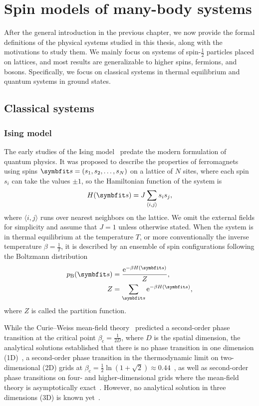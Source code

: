 \chapter{Spin models of many-body systems}
\label{ch:systems}

After the general introduction in the previous chapter, we now provide the formal definitions of the physical systems studied in this thesis, along with the motivations to study them. We mainly focus on systems of spin-$\frac{1}{2}$ particles placed on lattices, and most results are generalizable to higher spins, fermions, and bosons. Specifically, we focus on classical systems in thermal equilibrium and quantum systems in ground states.

\section{Classical systems}
\label{sec:cl-sys}

\subsection{Ising model}
\label{sec:cl-ising}

The early studies of the Ising model~\cite{ising1925contribution, niss2008history} predate the modern formulation of quantum physics. It was proposed to describe the properties of ferromagnets using spins $\vs = (s_1, s_2, \ldots, s_N)$ on a lattice of $N$ sites, where each spin $s_i$ can take the values $\pm 1$, so the Hamiltonian function of the system is
\begin{equation}
H(\vs) = J \sum_{\langle i, j \rangle} s_i s_j,
\label{eq:cl-ising}
\end{equation}
where $\langle i, j \rangle$ runs over nearest neighbors on the lattice. We omit the external fields for simplicity and assume that $J = 1$ unless otherwise stated. When the system is in thermal equilibrium at the temperature $T$, or more conventionally the inverse temperature $\beta = \frac{1}{T}$, it is described by an ensemble of spin configurations following the Boltzmann distribution
\begin{align}
p_\text{B}(\vs) &= \frac{\rme^{-\beta H(\vs)}}{Z}, \label{eq:boltzmann} \\
Z &= \sum_\vs \rme^{-\beta H(\vs)},
\end{align}
where $Z$ is called the partition function.

While the Curie--Weiss mean-field theory~\cite{weiss1907hypothese} predicted a second-order phase transition at the critical point $\beta_\text{c} = \frac{1}{2 D}$, where $D$ is the spatial dimension, the analytical solutions established that there is no phase transition in one dimension (1D)~\cite{ising1925contribution}, a second-order phase transition in the thermodynamic limit on two-dimensional (2D) grids at $\beta_\text{c} = \frac{1}{2} \ln(1 + \sqrt{2}) \approx 0.44$~\cite{onsager1944crystal}, as well as second-order phase transitions on four- and higher-dimensional grids where the mean-field theory is asymptotically exact~\cite{als1977mean}. However, no analytical solution in three dimensions (3D) is known yet~\cite{viswanathan2022does}.

